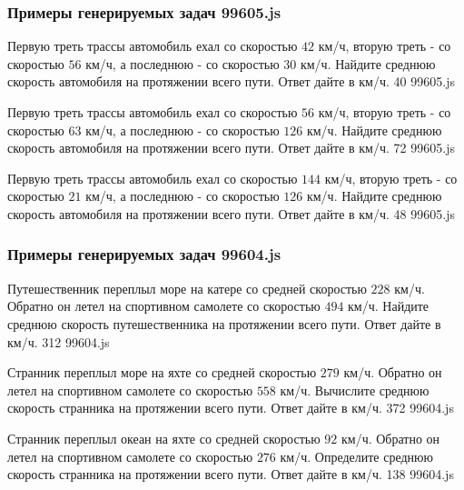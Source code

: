 \subsubsection*{Примеры генерируемых задач 99605.js}   

\par{Первую треть трассы автомобиль ехал со скоростью $42$ км/ч, вторую треть - со скоростью $56$ км/ч, а последнюю - со скоростью $30$ км/ч. Найдите среднюю скорость автомобиля на протяжении всего пути. Ответ дайте в км/ч. }{ 40 }{99605.js}
\par{Первую треть трассы автомобиль ехал со скоростью $56$ км/ч, вторую треть - со скоростью $63$ км/ч, а последнюю - со скоростью $126$ км/ч. Найдите среднюю скорость автомобиля на протяжении всего пути. Ответ дайте в км/ч. }{ 72 }{99605.js}
\par{Первую треть трассы автомобиль ехал со скоростью $144$ км/ч, вторую треть - со скоростью $21$ км/ч, а последнюю - со скоростью $126$ км/ч. Найдите среднюю скорость автомобиля на протяжении всего пути. Ответ дайте в км/ч. }{ 48 }{99605.js}


\subsubsection*{Примеры генерируемых задач 99604.js}   

\par{Путешественник переплыл море на катере со средней скоростью $228$ км/ч. Обратно он летел на спортивном самолете со скоростью $494$ км/ч. Найдите среднюю скорость путешественника на протяжении всего пути. Ответ дайте в км/ч. }{ 312 }{99604.js}
\par{Странник переплыл море на яхте со средней скоростью $279$ км/ч. Обратно он летел на спортивном самолете со скоростью $558$ км/ч. Вычислите среднюю скорость странника на протяжении всего пути. Ответ дайте в км/ч. }{ 372 }{99604.js}
\par{Странник переплыл океан на яхте со средней скоростью $92$ км/ч. Обратно он летел на спортивном самолете со скоростью $276$ км/ч. Определите среднюю скорость странника на протяжении всего пути. Ответ дайте в км/ч. }{ 138 }{99604.js}
